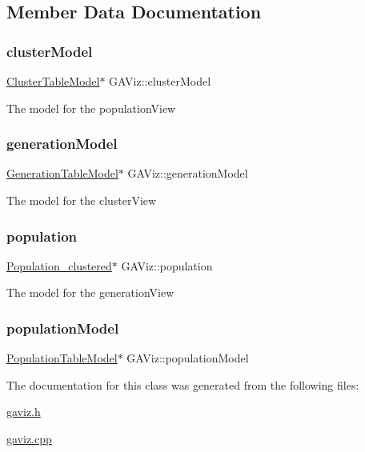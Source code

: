 \subsection{Member Data Documentation}
\mbox{\label{class_g_a_viz_a54ca452496eac96f82e2d9d7f02318a9}} 
\subsubsection{\texorpdfstring{cluster\+Model}{clusterModel}}
{\footnotesize\ttfamily \hyperlink{class_cluster_table_model}{Cluster\+Table\+Model}$\ast$ G\+A\+Viz\+::cluster\+Model}

The model for the population\+View \mbox{\label{class_g_a_viz_a7ecc629f7c9ab499cf483f836371f8f0}} 
\subsubsection{\texorpdfstring{generation\+Model}{generationModel}}
{\footnotesize\ttfamily \hyperlink{class_generation_table_model}{Generation\+Table\+Model}$\ast$ G\+A\+Viz\+::generation\+Model}

The model for the cluster\+View \mbox{\label{class_g_a_viz_a9b5057af4e3badc544bbab1efa0bdb39}} 
\subsubsection{\texorpdfstring{population}{population}}
{\footnotesize\ttfamily \hyperlink{class_population__clustered}{Population\+\_\+clustered}$\ast$ G\+A\+Viz\+::population}

The model for the generation\+View \mbox{\label{class_g_a_viz_adc930d20d092eeab1badfab22bbc8b6d}} 
\subsubsection{\texorpdfstring{population\+Model}{populationModel}}
{\footnotesize\ttfamily \hyperlink{class_population_table_model}{Population\+Table\+Model}$\ast$ G\+A\+Viz\+::population\+Model}



The documentation for this class was generated from the following files\+:\begin{DoxyCompactItemize}
\item 
\hyperlink{gaviz_8h}{gaviz.\+h}\item 
\hyperlink{gaviz_8cpp}{gaviz.\+cpp}\end{DoxyCompactItemize}
